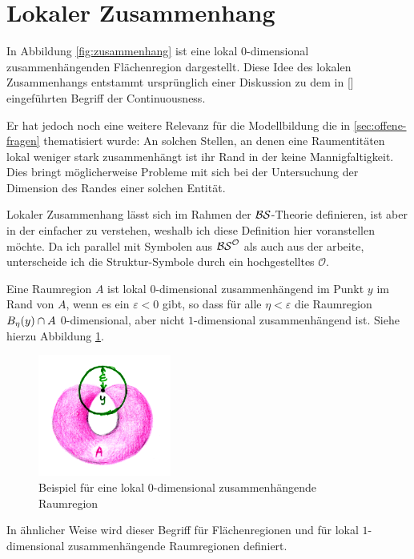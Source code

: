 \section{Lokaler Zusammenhang}\label{sec:lok-zusammenhang}

    In Abbildung \ref{fig:zusammenhang} ist 
    eine lokal $0$-dimensional zusammenhängenden Flächenregion dargestellt.
    Diese Idee des lokalen Zusammenhangs entstammt ursprünglich einer Diskussion zu dem in [\cite{baumann-r-2019--a}] eingeführten Begriff der Continuousness.

    Er hat jedoch noch eine weitere Relevanz für die Modellbildung die in \ref{sec:offene-fragen} thematisiert wurde:
    An solchen Stellen, an denen eine Raumentitäten lokal weniger stark zusammenhängt ist ihr Rand in der \strukt keine Mannigfaltigkeit.
    Dies bringt möglicherweise Probleme mit sich bei der Untersuchung der Dimension des Randes einer solchen Entität.

    Lokaler Zusammenhang lässt sich im Rahmen der $\mathcal{BS}$-Theorie definieren, ist aber in der \strukt einfacher zu verstehen, weshalb ich diese Definition hier voranstellen möchte.
    Da ich parallel mit Symbolen aus $\mathcal{BS}^{\mathcal{O}}$ als auch aus der \strukt arbeite, unterscheide ich die Struktur-Symbole durch ein hochgestelltes $\mathcal{O}$.

    Eine Raumregion $A$ ist lokal $0$-dimensional zusammenhängend im Punkt $y$ im Rand von $A$, wenn es ein $\varepsilon < 0$ gibt, so dass für alle $\eta < \varepsilon$ die Raumregion $B_{\eta}(y) \cap A$ $0$-dimensional, aber nicht $1$-dimensional zusammenhängend ist. Siehe hierzu Abbildung \ref{fig:loc0dc}.
    
    \begin{figure}[ht]
        \centering
        \includegraphics[height=4cm]{abb/loc0dc.png}
        \caption{Beispiel für eine lokal $0$-dimensional zusammenhängende Raumregion}
        \label{fig:loc0dc}
    \end{figure}
    
    In ähnlicher Weise wird dieser Begriff für Flächenregionen und für lokal $1$-dimensional zusammenhängende Raumregionen definiert.


